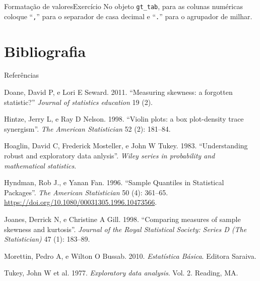 \documentclass[
  10pt,
  ignorenonframetext,
]{beamer}
\newlength{\cslhangindent}
\newlength{\cslentryspacingunit} %
\newenvironment{CSLReferences}[2] %
 {%
  \setlength{\parindent}{0pt}
  \ifodd #1
  \let\oldpar\par
  \def\par{\hangindent=\cslhangindent\oldpar}
  \fi
  \setlength{\parskip}{#2\cslentryspacingunit}
 }%
 {}
\begin{document}
\begin{frame}[fragile]{Formatação de valores\newline Exercício}
\protect\hypertarget{formatauxe7uxe3o-de-valoresexercuxedcio}{}
No objeto \texttt{gt\_tab}, para as colunas numéricas coloque
``\texttt{,}'' para o separador de casa decimal e ``\texttt{.}'' para o
agrupador de milhar.
\end{frame}

\hypertarget{bibliografia}{%
\section{Bibliografia}\label{bibliografia}}

\begin{frame}{Referências}
\protect\hypertarget{referuxeancias}{}
\hypertarget{refs}{}
\begin{CSLReferences}{1}{0}
\leavevmode{}%
Doane, David P, e Lori E Seward. 2011. {``Measuring skewness: a
forgotten statistic?''} \emph{Journal of statistics education} 19 (2).

\leavevmode{}%
Hintze, Jerry L, e Ray D Nelson. 1998. {``Violin plots: a box
plot-density trace synergism''}. \emph{The American Statistician} 52
(2): 181--84.

\leavevmode{}%
Hoaglin, David C, Frederick Mosteller, e John W Tukey. 1983.
{``Understanding robust and exploratory data anlysis''}. \emph{Wiley
series in probability and mathematical statistics}.

\leavevmode{}%
Hyndman, Rob J., e Yanan Fan. 1996. {``Sample Quantiles in Statistical
Packages''}. \emph{The American Statistician} 50 (4): 361--65.
\url{https://doi.org/10.1080/00031305.1996.10473566}.

\leavevmode{}%
Joanes, Derrick N, e Christine A Gill. 1998. {``Comparing measures of
sample skewness and kurtosis''}. \emph{Journal of the Royal Statistical
Society: Series D (The Statistician)} 47 (1): 183--89.

\leavevmode{}%
Morettin, Pedro A, e Wilton O Bussab. 2010. \emph{Estatística Básica}.
Editora Saraiva.

\leavevmode{}%
Tukey, John W et al. 1977. \emph{Exploratory data analysis}. Vol. 2.
Reading, MA.

\end{CSLReferences}
\end{frame}
\end{document}
